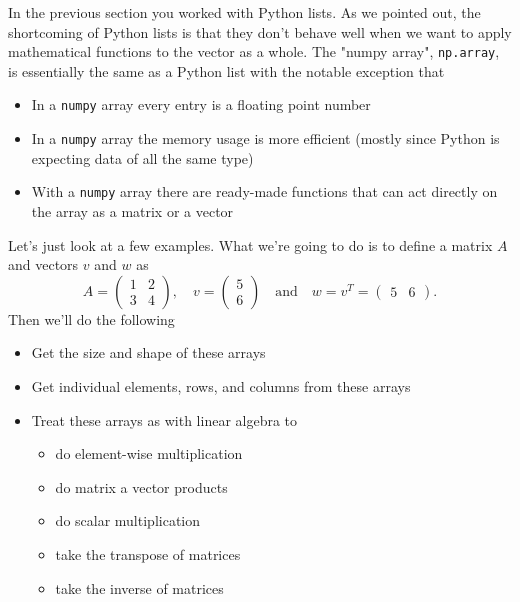 \documentclass[
]{book}
\providecommand{\tightlist}{%
  \setlength{\itemsep}{0pt}\setlength{\parskip}{0pt}}
\theoremstyle{definition}
\theoremstyle{definition}
\theoremstyle{definition}
\theoremstyle{remark}
\begin{document}
In the previous section you worked with Python lists. As we pointed out, the shortcoming of Python lists is that they don't behave well when we want to apply mathematical functions to the vector as a whole. The "numpy array", \texttt{np.array}, is essentially the same as a Python list with the notable exception that

\begin{itemize}
\tightlist
\item
  In a \texttt{numpy} array every entry is a floating point number
\item
  In a \texttt{numpy} array the memory usage is more efficient (mostly since Python is expecting data of all the same type)
\item
  With a \texttt{numpy} array there are ready-made functions that can act directly on the array as a matrix or a vector
\end{itemize}

Let's just look at a few examples. What we're going to do is to define a matrix \(A\) and vectors \(v\) and \(w\) as
\[A = \begin{pmatrix} 1 & 2 \\ 3 & 4 \end{pmatrix}, \quad v = \begin{pmatrix} 5\\6 \end{pmatrix}
\quad \text{and} \quad w = v^T = \begin{pmatrix} 5 & 6 \end{pmatrix}.\]
Then we'll do the following

\begin{itemize}
\tightlist
\item
  Get the size and shape of these arrays
\item
  Get individual elements, rows, and columns from these arrays
\item
  Treat these arrays as with linear algebra to

  \begin{itemize}
  \tightlist
  \item
    do element-wise multiplication
  \item
    do matrix a vector products
  \item
    do scalar multiplication
  \item
    take the transpose of matrices
  \item
    take the inverse of matrices
  \end{itemize}
\end{itemize}
\end{document}
